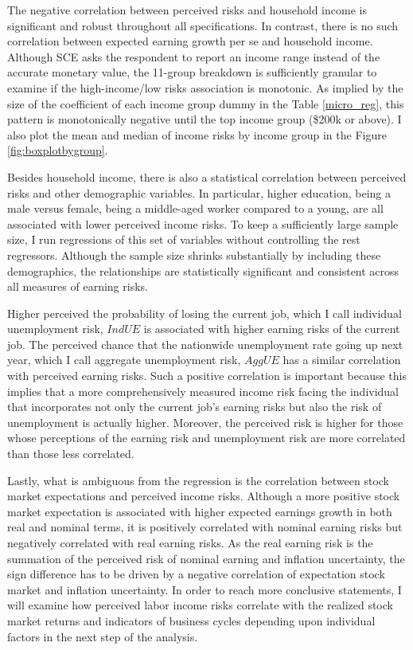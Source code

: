 \documentclass[12pt,notitlepage,onecolumn,aps,pra]{article}
\begin{document}
The negative correlation between perceived risks and household income is
significant and robust throughout all specifications. In contrast, there
is no such correlation between expected earning growth per se and
household income. Although SCE asks the respondent to report an income
range instead of the accurate monetary value, the 11-group breakdown is
sufficiently granular to examine if the high-income/low risks
association is monotonic. As implied by the size of the coefficient of
each income group dummy in the Table \ref{micro_reg}, this pattern is
monotonically negative until the top income group (\$200k or above). I
also plot the mean and median of income risks by income group in the
Figure \ref{fig:boxplotbygroup}.

Besides household income, there is also a statistical correlation
between perceived risks and other demographic variables. In particular,
higher education, being a male versus female, being a middle-aged worker
compared to a young, are all associated with lower perceived income
risks. To keep a sufficiently large sample size, I run regressions of
this set of variables without controlling the rest regressors. Although
the sample size shrinks substantially by including these demographics,
the relationships are statistically significant and consistent across
all measures of earning risks.

Higher perceived the probability of losing the current job, which I call
individual unemployment risk, \(\textit{IndUE}\) is associated with
higher earning risks of the current job. The perceived chance that the
nationwide unemployment rate going up next year, which I call aggregate
unemployment risk, \(\textit{AggUE}\) has a similar correlation with
perceived earning risks. Such a positive correlation is important
because this implies that a more comprehensively measured income risk
facing the individual that incorporates not only the current job's
earning risks but also the risk of unemployment is actually higher.
Moreover, the perceived risk is higher for those whose perceptions of
the earning risk and unemployment risk are more correlated than those
less correlated.

Lastly, what is ambiguous from the regression is the correlation between
stock market expectations and perceived income risks. Although a more
positive stock market expectation is associated with higher expected
earnings growth in both real and nominal terms, it is positively
correlated with nominal earning risks but negatively correlated with
real earning risks. As the real earning risk is the summation of the
perceived risk of nominal earning and inflation uncertainty, the sign
difference has to be driven by a negative correlation of expectation
stock market and inflation uncertainty. In order to reach more
conclusive statements, I will examine how perceived labor income risks
correlate with the realized stock market returns and indicators of
business cycles depending upon individual factors in the next step of
the analysis.
\end{document}

